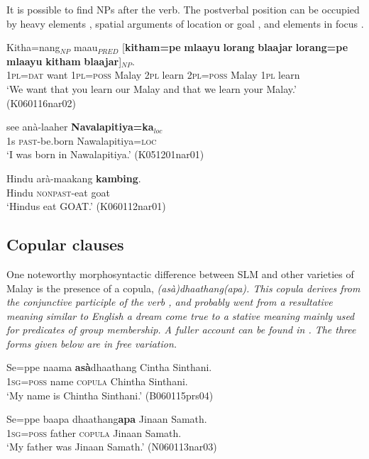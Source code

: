  

It is possible to find NPs after the verb. The postverbal position  can be occupied by 
 heavy elements , 
 spatial arguments of location or goal , and 
 elements in focus . 

\ea\label{ex:clause:decl:right:heavy}
\gll Kitha=nang$_{NP}$ maau$_{PRED}$ [\textbf{kitham=pe} \textbf{mlaayu} \textbf{lorang} \textbf{blaajar} \textbf{lorang=pe} \textbf{mlaayu} \textbf{kitham} \textbf{blaajar}]$_{NP}$. \\
 1\textsc{pl}=\textsc{dat} want 1\textsc{pl}=\textsc{poss} Malay 2\textsc{pl} learn 2\textsc{pl}=\textsc{poss} Malay 1\textsc{pl} learn\\
`We want that you learn our Malay and that we learn your Malay.' (K060116nar02)
\z

\ea\label{ex:clause:decl:right:local1}
\gll see anà-laaher     \textbf{Navalapitiya=ka}$_{loc}$ \\
     1s \textsc{past}-be.born Nawalapitiya=\textsc{loc}  \\
    `I was born in Nawalapitiya.' (K051201nar01)
\z

\ea\label{ex:clause:decl:right:foc2}
\gll Hindu arà-maakang \textbf{kambing}. \\
 Hindu \textsc{nonpast}-eat goat\\
`Hindus eat GOAT.' (K060112nar01)
\z

\subsection{Copular clauses}
One  noteworthy morphosyntactic difference between SLM and other varieties of Malay is the presence of a copula, \em (asà)dhaathang(apa)\em. This copula derives from the conjunctive participle of the verb , and probably went from a resultative meaning similar to English \em a dream come true \em to  a stative meaning mainly used for predicates of group membership. A fuller account can be found in \citet{Nordhoff2011copula}. The three forms given below are in free variation.

\ea
\gll Se=ppe    naama \textbf{asà}dhaathang  Cintha Sinthani. \\
     1\textsc{sg}=\textsc{poss} name \textsc{copula} Chintha Sinthani. \\
    `My name is Chintha Sinthani.' (B060115prs04)
\z
 
\ea
\gll Se=ppe    baapa  dhaathang\textbf{apa}  Jinaan Samath. \\
     1\textsc{sg}=\textsc{poss} father \textsc{copula} Jinaan Samath. \\
    `My father was Jinaan Samath.' (N060113nar03)
\z

